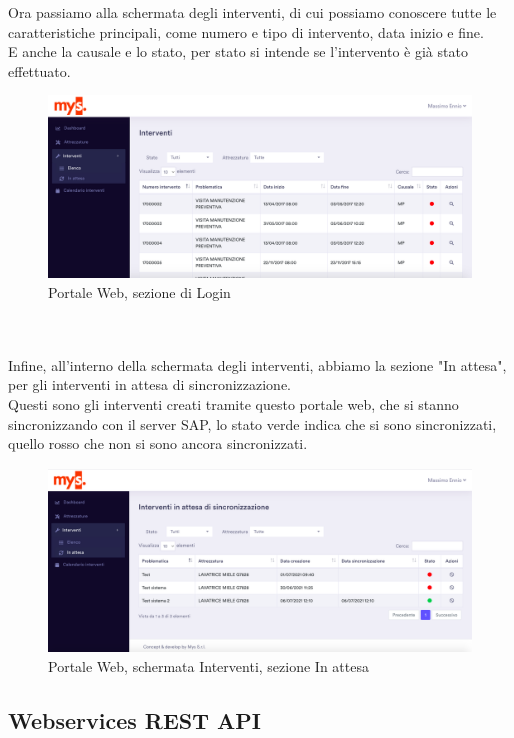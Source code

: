 Ora passiamo alla schermata degli interventi, di cui possiamo conoscere tutte le caratteristiche principali, come numero e tipo di intervento, data inizio e fine.\\
E anche la causale e lo stato, per stato si intende se l'intervento è già stato effettuato.
\begin{figure}[!h] 
	\centering 
	\includegraphics[scale = 0.25]{immagini/portale/interventi.png} 
	\caption {Portale Web, sezione di Login}
\end{figure}
\\\\Infine, all'interno della schermata degli interventi, abbiamo la sezione "In attesa", per gli interventi in attesa di sincronizzazione.\\
Questi sono gli interventi creati tramite questo portale web, che si stanno sincronizzando con il server SAP, lo stato verde indica che si sono sincronizzati, quello rosso che non si sono ancora sincronizzati.
\begin{figure}[!h] 
	\centering 
	\includegraphics[scale = 0.25]{immagini/portale/interventi-in-attesa.png} 
	\caption {Portale Web, schermata Interventi, sezione In attesa}
\end{figure}
\pagebreak
\subsection{Webservices REST API}

